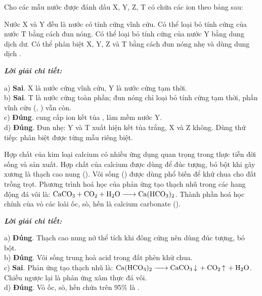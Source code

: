 \documentclass[11pt,a4paper]{article}
\def\loigiai#1{
\par\begingroup\color{blue!80!black}\small
\noindent\textbf{\textit{Lời giải chi tiết:}}\par
#1\par\endgroup}
\begin{document}
\begin{ex}
Cho các mẫu nước được đánh dấu X, Y, Z, T có chứa các ion theo bảng sau:
\par{}\vspace{1pt}
\choiceTF
{Nước X và Y đều là nước có tính cứng vĩnh cửu.}
{Có thể loại bỏ tính cứng của nước T bằng cách đun nóng.}
{\True Có thể loại bỏ tính cứng của nước Y bằng dung dịch  dư.}
{\True Có thể phân biệt X, Y, Z và T bằng cách đun nóng nhẹ và dùng dung dịch .}
\loigiai{
a) \textbf{Sai}. X là nước cứng vĩnh cửu, Y là nước cứng tạm thời.\\
b) \textbf{Sai}. T là nước cứng toàn phần; đun nóng chỉ loại bỏ tính cứng tạm thời, phần vĩnh cửu (\ce{Cl-}, \ce{SO4^2-}) vẫn còn.\\
c) \textbf{Đúng}. \ce{Na2CO3} cung cấp ion \ce{CO3^2-} kết tủa \ce{Ca^2+}, \ce{Mg^2+} làm mềm nước Y.\\
d) \textbf{Đúng}. Đun nhẹ: Y và T xuất hiện kết tủa trắng, X và Z không. Dùng \ce{NaOH} thử tiếp: phân biệt được từng mẫu riêng biệt.}
\end{ex}

\begin{ex}
Hợp chất của kim loại calcium có nhiều ứng dụng quan trọng trong thực tiễn đời sống và sản xuất.
\choiceTF
{\True Hợp chất của calcium được dùng để đúc tượng, bó bột khi gãy xương là thạch cao nung ().}
{\True Vôi sống () được dùng phổ biến để khử chua cho đất trồng trọt.}
{Phương trình hoá học của phản ứng tạo thạch nhũ trong các hang động đá vôi là: $\ce{CaCO3 + CO2 + H2O -> Ca(HCO3)2}$.}
{\True Thành phần hoá học chính của vỏ các loài ốc, sò, hến là calcium carbonate ().}
\loigiai{
a) \textbf{Đúng}. Thạch cao nung nở thể tích khi đông cứng nên dùng đúc tượng, bó bột.\\
b) \textbf{Đúng}. Vôi sống trung hoà acid trong đất phèn khử chua.\\
c) \textbf{Sai}. Phản ứng tạo thạch nhũ là: $\ce{Ca(HCO3)2 -> CaCO3 v + CO2 ^ + H2O}$. Chiều ngược lại là phản ứng xâm thực đá vôi.\\
d) \textbf{Đúng}. Vỏ ốc, sò, hến chứa trên 95\% là \ce{CaCO3}.}
\end{ex}
\end{document}
